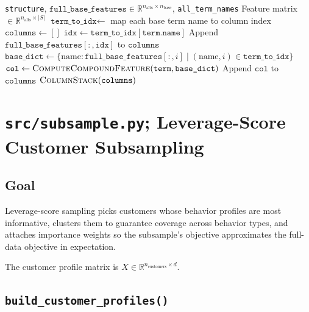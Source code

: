 \documentclass[11pt,a4paper]{article}
\begin{document}
\begin{algorithm}[H]
\caption{\textsc{BuildStructureFeatures}}\label{alg:build-struct-feats}
\begin{algorithmic}[1]
\Require \texttt{structure}, $\texttt{full\_base\_features} \in \mathbb{R}^{n_{\text{alts}} \times n_{\text{base}}}$, \texttt{all\_term\_names}
\Ensure Feature matrix $\in \mathbb{R}^{n_{\text{alts}} \times |S|}$
\State $\texttt{term\_to\_idx} \gets$ map each base term name to column index
\State $\texttt{columns} \gets []$
        \State $\texttt{idx} \gets \texttt{term\_to\_idx}[\texttt{term.name}]$
        \State Append $\texttt{full\_base\_features}[:, \texttt{idx}]$ to $\texttt{columns}$
    \Else
        \State $\texttt{base\_dict} \gets \{\text{name}: \texttt{full\_base\_features}[:, i] \mid (\text{name}, i) \in \texttt{term\_to\_idx}\}$
        \State $\texttt{col} \gets \Call{ComputeCompoundFeature}{\texttt{term}, \texttt{base\_dict}}$
        \State Append $\texttt{col}$ to $\texttt{columns}$
    \EndIf
\EndFor
\State \Return $\Call{ColumnStack}{\texttt{columns}}$
\end{algorithmic}
\end{algorithm}


\section{\texttt{src/subsample.py}; Leverage-Score Customer Subsampling}
\label{sec:subsample}

\subsection{Goal}

Leverage-score sampling picks customers whose behavior profiles are most informative, clusters them to guarantee coverage across behavior types, and attaches importance weights so the subsample's objective approximates the full-data objective in expectation.

The customer profile matrix is $X \in \mathbb{R}^{n_{\text{customers}} \times d}$.

\subsection{\texttt{build\_customer\_profiles()}}
\end{document}
